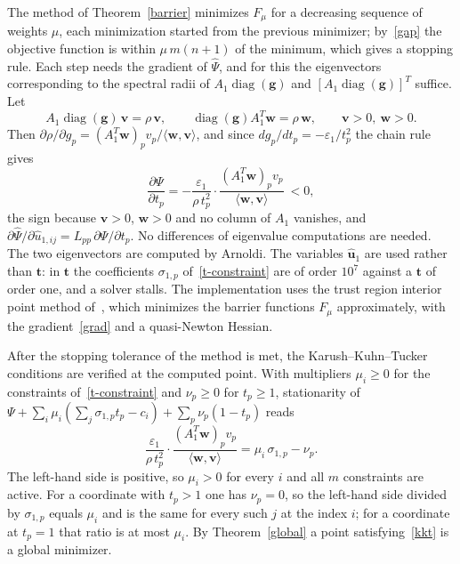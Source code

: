 \documentclass[11pt]{article}
\theoremstyle{plain}
\theoremstyle{definition}
\theoremstyle{remark}
\numberwithin{equation}{section}
\numberwithin{figure}{section}
\numberwithin{table}{section}
\begin{document}
The method of Theorem~\ref{barrier} minimizes $F_{\mu}$ for a decreasing
sequence of weights $\mu$, each minimization started from the previous
minimizer; by~\eqref{gap} the objective function is within $\mu\,m(n+1)$ of the
minimum, which gives a stopping rule. Each step needs the gradient of
$\widehat\Psi$, and for this the eigenvectors corresponding to the spectral
radii of $A_1\operatorname{diag}(\bm g)$ and
$\left[A_1\operatorname{diag}(\bm g)\right]^T$ suffice. Let
\begin{equation}\label{perron}
A_1\operatorname{diag}(\bm g)\,\bm v=\rho\,\bm v,\qquad
\operatorname{diag}(\bm g)A_1^T\bm w=\rho\,\bm w,\qquad \bm v>0,\ \bm w>0 .
\end{equation}
Then
$\partial\rho/\partial g_p=\left(A_1^T\bm w\right)_pv_p/\langle\bm w,\bm v\rangle$,
and since $dg_p/dt_p=-\varepsilon_1/t_p^2$ the chain rule gives
\begin{equation}\label{grad}
\frac{\partial\Psi}{\partial t_p}
=-\frac{\varepsilon_1}{\rho\,t_p^2}\cdot
\frac{\left(A_1^T\bm w\right)_p v_p}{\langle\bm w,\bm v\rangle}\ <0 ,
\end{equation}
the sign because $\bm v>0$, $\bm w>0$ and no column of $A_1$ vanishes, and
$\partial\widehat\Psi/\partial\widehat u_{1,ij}=L_{pp}\,\partial\Psi/\partial t_p$.
No differences of eigenvalue computations are needed. The two eigenvectors are
computed by Arnoldi. The variables $\widehat{\bm u}_1$ are used rather than
$\bm t$: in $\bm t$ the coefficients $\sigma_{1,p}$ of~\eqref{t-constraint} are
of order $10^{7}$ against a $\bm t$ of order one, and a solver stalls. The
implementation uses the trust region interior point method
of~\cite{1999Byrd_Hribar_Nocedal}, which minimizes the barrier functions
$F_\mu$ approximately, with the gradient~\eqref{grad} and a quasi-Newton
Hessian.

After the stopping tolerance of the method is met, the Karush--Kuhn--Tucker
conditions are verified at the computed point. With multipliers $\mu_i\ge 0$
for the constraints of~\eqref{t-constraint} and $\nu_p\ge 0$ for $t_p\ge 1$,
stationarity of
$\Psi+\sum_i\mu_i\left(\sum_j\sigma_{1,p}t_p-c_i\right)
+\sum_p\nu_p\left(1-t_p\right)$ reads
\begin{equation}\label{kkt}
\frac{\varepsilon_1}{\rho\,t_p^2}\cdot
\frac{\left(A_1^T\bm w\right)_pv_p}{\langle\bm w,\bm v\rangle}
=\mu_i\,\sigma_{1,p}-\nu_p .
\end{equation}
The left-hand side is positive, so $\mu_i>0$ for every $i$ and all $m$
constraints are active. For a coordinate with $t_p>1$ one has $\nu_p=0$, so the
left-hand side divided by $\sigma_{1,p}$ equals $\mu_i$ and is the same for
every such $j$ at the index $i$; for a coordinate at $t_p=1$ that ratio is at
most $\mu_i$. By Theorem~\ref{global} a point satisfying~\eqref{kkt} is a global
minimizer.
\end{document}
